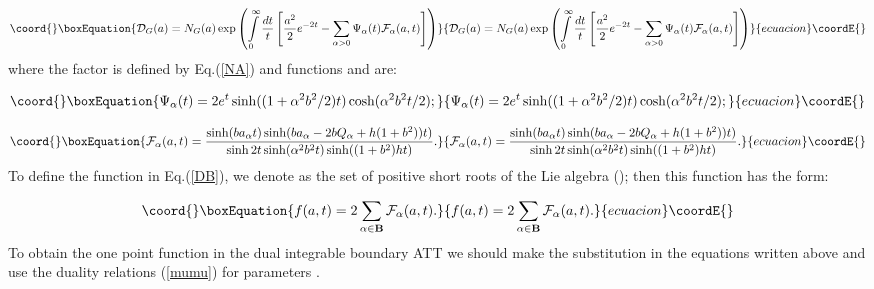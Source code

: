\documentclass[a4paper,12pt,titlepage,final]{article}
\begin{document}
\begin{equation}\coord{}\boxEquation{
\mathcal{D}_{G}(a)=N_{G}(a)\exp \left( \int\limits_{0}^{\infty }\frac{dt}{t}
\left[ \frac{a^{2}}{2}e^{-2t}-\sum_{\alpha >0}\Psi _{\alpha }(t)
\mathcal{F}_{\alpha }(a,t)\right] \right)  \label{DG}
}{
\mathcal{D}_{G}(a)=N_{G}(a)\exp \left( \int\limits_{0}^{\infty }\frac{dt}{t}
\left[ \frac{a^{2}}{2}e^{-2t}-\sum_{\alpha >0}\Psi _{\alpha }(t)
\mathcal{F}_{\alpha }(a,t)\right] \right)  }{ecuacion}\coordE{}\end{equation}
where the factor \coordHE{} is defined by Eq.(\ref{NA}) and functions \myHighlight{$\Psi
_{\alpha }$}\coordHE{} and \coordHE{} are:

\begin{equation}\coord{}\boxEquation{
\Psi _{\alpha }(t)=2e^{t}\sinh ((1+\alpha ^{2}b^{2}/2)t)\cosh (\alpha
^{2}b^{2}t/2);  \label{psi}
}{
\Psi _{\alpha }(t)=2e^{t}\sinh ((1+\alpha ^{2}b^{2}/2)t)\cosh (\alpha
^{2}b^{2}t/2);  }{ecuacion}\coordE{}\end{equation}

\begin{equation}\coord{}\boxEquation{
\mathcal{F}_{\alpha }(a,t)=\frac{\sinh (ba_{\alpha }t)\sinh (ba_{\alpha
}-2bQ_{\alpha }+h(1+b^{2}))t)}{\sinh 2t\sinh (\alpha ^{2}b^{2}t)\sinh
((1+b^{2})ht)}.  \label{cal}
}{
\mathcal{F}_{\alpha }(a,t)=\frac{\sinh (ba_{\alpha }t)\sinh (ba_{\alpha
}-2bQ_{\alpha }+h(1+b^{2}))t)}{\sinh 2t\sinh (\alpha ^{2}b^{2}t)\sinh
((1+b^{2})ht)}.  }{ecuacion}\coordE{}\end{equation}
To define the function \coordHE{} in Eq.(\ref{DB}), we denote as
\coordHE{} the set of positive short roots of the Lie algebra
\coordHE{} (\coordHE{}); then this function has
the form:

\begin{equation}\coord{}\boxEquation{
f(a,t)=2\sum_{\alpha \in \mathbf{B}}\mathcal{F}_{\alpha }(a,t).  \label{f}
}{
f(a,t)=2\sum_{\alpha \in \mathbf{B}}\mathcal{F}_{\alpha }(a,t).  }{ecuacion}\coordE{}\end{equation}
To obtain the one point function in the dual integrable boundary
\coordHE{} ATT we should make the substitution \coordHE{}
in the equations written above and use the duality relations
(\ref{mumu}) for parameters \coordHE{}.
\end{document}
